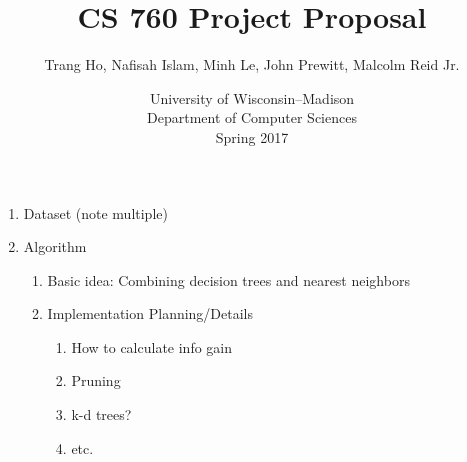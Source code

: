 \documentclass[10pt]{article}
\title{CS 760 Project Proposal}
\author{Trang Ho, Nafisah Islam, Minh Le, John Prewitt, Malcolm Reid Jr.}
\date{University of Wisconsin--Madison\\Department of Computer Sciences\\Spring 2017}
\begin{document}
\setlength{\baselineskip}{18pt}
\maketitle

\begin{enumerate}
\item Dataset (note multiple)
\item Algorithm
    \begin{enumerate}
    \item Basic idea: Combining decision trees and nearest neighbors
    \item Implementation Planning/Details
        \begin{enumerate}
            \item How to calculate info gain
            \item Pruning
            \item k-d trees?
            \item etc.
        \end{enumerate}
    \end{enumerate}
\end{enumerate}
\end{document}
